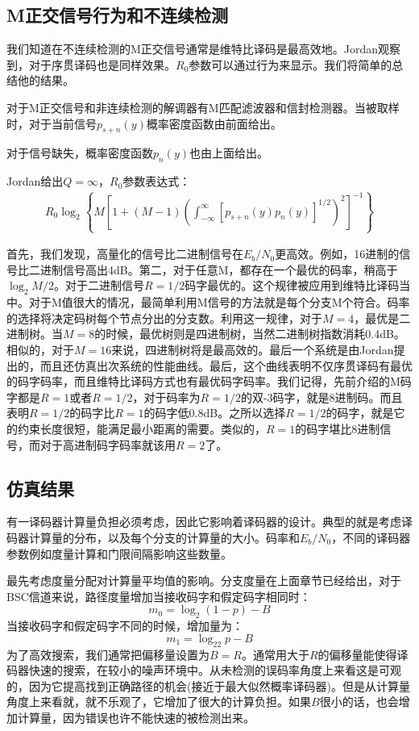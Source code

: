 \documentclass[twoside,numberorder]{buptthesis}
\begin{document}
\subsection{M正交信号行为和不连续检测}
我们知道在不连续检测的M正交信号通常是维特比译码是最高效地。Jordan观察到，对于序贯译码也是同样效果。$R_0$参数可以通过行为来显示。我们将简单的总结他的结果。

对于M正交信号和非连续检测的解调器有M匹配滤波器和信封检测器。当被取样时，对于当前信号$p_{s+n}(y)$概率密度函数由前面给出。

对于信号缺失，概率密度函数$p_n(y)$也由上面给出。

Jordan给出$Q=\infty$，$R_0$参数表达式：
\begin{eqnarray}
  R_0\log_2\left\{M\left[1+(M-1)\left(\int_{-\infty}^{\infty}[p_{s+n}(y)p_n(y)]^{1/2}\right)^2\right]^{-1}\right\}
  \label{equ:19}
\end{eqnarray}

首先，我们发现，高量化的信号比二进制信号在$E_b/N_0$更高效。例如，16进制的信号比二进制信号高出4dB。第二，对于任意M，都存在一个最优的码率，稍高于$\log_2M/2$。对于二进制信号$R=1/2$码字最优的。这个规律被应用到维特比译码当中。对于M值很大的情况，最简单利用M信号的方法就是每个分支M个符合。码率的选择将决定码树每个节点分出的分支数。利用这一规律，对于$M=4$，最优是二进制树。当$M=8$的时候，最优树则是四进制树，当然二进制树指数消耗0.4dB。相似的，对于$M=16$来说，四进制树将是最高效的。最后一个系统是由Jordan提出的，而且还仿真出次系统的性能曲线。最后，这个曲线表明不仅序贯译码有最优的码字码率，而且维特比译码方式也有最优码字码率。我们记得，先前介绍的M码字都是$R=1$或者$R=1/2$，对于码率为$R=1/2$的双-3码字，就是8进制码。而且表明$R=1/2$的码字比$R=1$的码字低0.8dB。之所以选择$R=1/2$的码字，就是它的约束长度很短，能满足最小距离的需要。类似的，$R=1$的码字堪比8进制信号，而对于高进制码字码率就该用$R=2$了。

\subsection{仿真结果}
有一译码器计算量负担必须考虑，因此它影响着译码器的设计。典型的就是考虑译码器计算量的分布，以及每个分支的计算量的大小。码率和$E_b/N_0$，不同的译码器参数例如度量计算和门限间隔影响这些数量。

最先考虑度量分配对计算量平均值的影响。分支度量在上面章节已经给出，对于BSC信道来说，路径度量增加当接收码字和假定码字相同时：
\begin{equation}
  m_0=\log_2(1-p)-B
  \label{equ:20}
\end{equation}
当接收码字和假定码字不同的时候，增加量为：
\begin{equation}
  m_1=\log_22p-B
  \label{equ:21}
\end{equation}
为了高效搜索，我们通常把偏移量设置为$B=R$。通常用大于$R$的偏移量能使得译码器快速的搜索，在较小的噪声环境中。从未检测的误码率角度上来看这是可观的，因为它提高找到正确路径的机会(接近于最大似然概率译码器)。但是从计算量角度上来看就，就不乐观了，它增加了很大的计算负担。如果$B$很小的话，也会增加计算量，因为错误也许不能快速的被检测出来。
\end{document}
